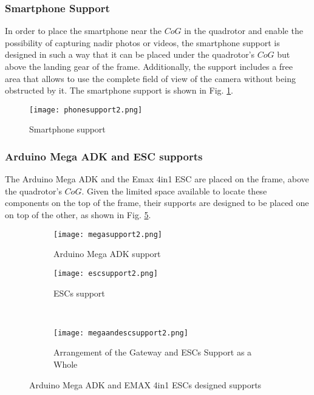 \subsubsection{Smartphone Support}
In order to place the smartphone near the $CoG$ in the quadrotor and enable the possibility of capturing nadir photos or videos, the smartphone support is designed in such a way that it can be placed under the quadrotor's $CoG$ but above the landing gear of the frame. Additionally, the support includes a free area that allows to use the complete field of view of the camera without being obstructed by it. The smartphone support is shown in Fig. \ref{fig:phonesupport}.
\begin{figure}[h]
	\begin{center}
		\texttt{[image: phonesupport2.png]}    
		\caption{Smartphone support} 
		\label{fig:phonesupport}
	\end{center}
\end{figure}
\vspace{-0.5cm}
\subsubsection{Arduino Mega ADK and ESC supports}
The Arduino Mega ADK and the Emax 4in1 ESC are placed on the frame, above the quadrotor's $CoG$. Given the limited space available to locate these components on the top of the frame, their supports are designed to be placed one on top of the other, as shown in Fig. \ref{fig:megaandescsupports}.
\begin{figure}[h]
\begin{subfigure}{.5\linewidth}
\centering
\texttt{[image: megasupport2.png]}
\caption{Arduino Mega ADK support} 
\label{fig:megasupport}
\end{subfigure}%
\begin{subfigure}{.5\linewidth}
\centering
\texttt{[image: escsupport2.png]}
\caption{ESCs support} 
\label{fig:escsupport}
\end{subfigure}\\[1ex]
\begin{subfigure}{\linewidth}
\centering
\texttt{[image: megaandescsupport2.png]}
\caption{Arrangement of the Gateway and ESCs Support as a Whole} 
\label{fig:megaandescsupport}
\end{subfigure}
\caption{Arduino Mega ADK and EMAX 4in1 ESCs designed supports}
\label{fig:megaandescsupports}
\end{figure}

